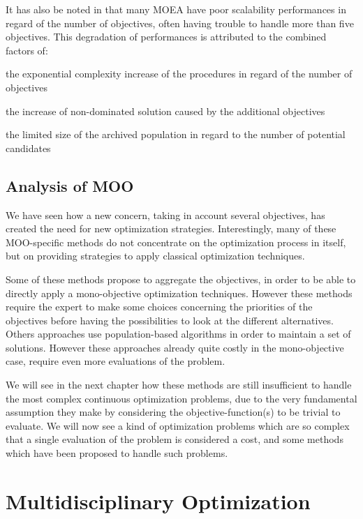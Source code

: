 It has also be noted in \cite{corne2007techniques} that many MOEA have poor scalability performances in regard of the number of objectives, often having trouble to handle more than five objectives. This degradation of performances is attributed to the combined factors of:
\begin{compactitem}
\item the exponential complexity increase of the procedures in regard of the number of objectives
\item the increase of non-dominated solution caused by the additional objectives
\item the limited size of the archived population in regard to the number of potential candidates
\end{compactitem}

\section{Analysis of MOO}

We have seen how a new concern, taking in account several objectives, has created the need for new optimization strategies.  Interestingly, many of these MOO-specific methods do not concentrate on the optimization process in itself, but on providing strategies to apply classical optimization techniques.

Some of these methods propose to aggregate the objectives, in order to be able to directly apply a mono-objective optimization techniques. However these methods require the expert to make some choices concerning the priorities of the objectives before having the possibilities to look at the different alternatives.\\
Others approaches use population-based algorithms in order to maintain a set of solutions. However these approaches already quite costly in the mono-objective case, require even more evaluations of the problem.

We will see in the next chapter how these methods are still insufficient to handle the most complex continuous optimization problems, due to the very fundamental assumption they make by considering the objective-function(s) to be trivial to evaluate. We will now see a kind of optimization problems which are so complex that a single evaluation of the problem is considered a cost, and some methods which have been proposed to handle such problems.

\chapter{Multidisciplinary Optimization}\label{MDO_chapter}

